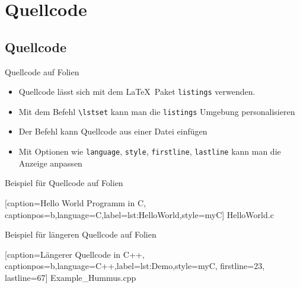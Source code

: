 \documentclass[mathserif,serif,german]{beamer}
\begin{document}
\section{Quellcode}
\subsection{Quellcode}


\begin{frame}[fragile]{Quellcode auf Folien}
	
	\begin{itemize}
		\item Quellcode lässt sich mit dem \LaTeX~Paket \verb|listings| verwenden.
		\item Mit dem Befehl \verb|\lstset| kann man die \verb|listings| Umgebung personalisieren
		\item Der Befehl \verb|| kann Quellcode aus einer Datei einfügen
		\item Mit Optionen wie \verb|language|, \verb|style|, \verb|firstline|, \verb|lastline| kann man die Anzeige anpassen
	\end{itemize}
	
	
\end{frame}	


\begin{frame}[fragile]{Beispiel für Quellcode auf Folien}
	
	
	[caption={Hello World Programm in C},
	captionpos=b,language=C,label={lst:HelloWorld},style=myC]
	{HelloWorld.c}
	
\end{frame}	


\begin{frame}[fragile,shrink=50]{Beispiel für längeren Quellcode auf Folien}
	
	
	\footnotesize
	
	[caption={Längerer Quellcode in C++},
	captionpos=b,language=C++,label={lst:Demo},style=myC, firstline=23, lastline=67]
	{Example_Hummus.cpp}	
	
\end{frame}	
\end{document}
